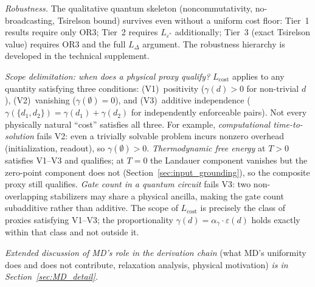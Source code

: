 \documentclass[11pt]{article}
\theoremstyle{remark}
\begin{document}
\smallskip\noindent\textit{Robustness.}  The qualitative quantum skeleton (noncommutativity, no-broadcasting, Tsirelson bound) survives even without a uniform cost floor: Tier~1 results require only OR3; Tier~2 requires $L_{\varepsilon^*}$ additionally; Tier~3 (exact Tsirelson value) requires OR3 and the full $L_\Delta$ argument.  The robustness hierarchy is developed in the technical supplement.

\smallskip\noindent\textit{Scope delimitation: when does a physical proxy qualify?}  $L_{\mathrm{cost}}$ applies to any quantity satisfying three conditions: (V1)~positivity ($\gamma(d) > 0$ for non-trivial $d$), (V2)~vanishing ($\gamma(\emptyset) = 0$), and (V3)~additive independence ($\gamma(\{d_1, d_2\}) = \gamma(d_1) + \gamma(d_2)$ for independently enforceable pairs).  Not every physically natural ``cost'' satisfies all three.  For example, \emph{computational time-to-solution} fails V2: even a trivially solvable problem incurs nonzero overhead (initialization, readout), so $\gamma(\emptyset) > 0$.  \emph{Thermodynamic free energy} at $T > 0$ satisfies V1--V3 and qualifies; at $T = 0$ the Landauer component vanishes but the zero-point component does not (Section~\ref{sec:input_grounding}), so the composite proxy still qualifies.  \emph{Gate count in a quantum circuit} fails V3: two non-overlapping stabilizers may share a physical ancilla, making the gate count subadditive rather than additive.  The scope of $L_{\mathrm{cost}}$ is precisely the class of proxies satisfying V1--V3; the proportionality $\gamma(d) = \alpha_\gamma \cdot \varepsilon(d)$ holds exactly within that class and not outside it.

\smallskip\noindent\textit{Extended discussion of MD's role in the derivation chain} (what MD's uniformity does and does not contribute, relaxation analysis, physical motivation) \textit{is in Section~\ref{sec:MD_detail}.}
\end{document}

